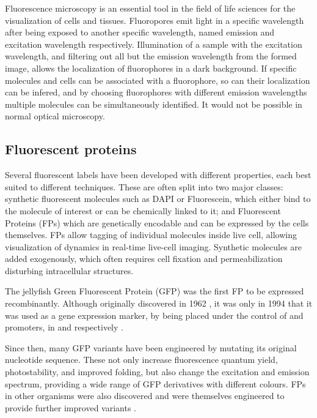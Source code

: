   Fluorescence microscopy is an essential tool in the field of life
  sciences for the visualization of cells and tissues.
  Fluoropores emit light in a specific wavelength after
  being exposed to another specific wavelength, named
  emission and excitation wavelength respectively.
  Illumination of a sample with the excitation wavelength, and filtering
  out all but the emission wavelength from the formed image, allows
  the localization of fluorophores in a dark background.
  If specific molecules and cells can be associated with a fluorophore,
  so can their localization can be infered, and by choosing fluorophores
  with different emission wavelengths multiple molecules can be
  simultaneously identified.
  It would not be possible in normal optical microscopy.

  \subsection{Fluorescent proteins}
    Several fluorescent labels have been developed with different
    properties, each best suited to different techniques.
    These are often split into two major classes: synthetic fluorescent
    molecules such as DAPI or Fluorescein, which either bind to the molecule of
    interest or can be chemically linked to it; and Fluorescent Proteins (FPs)
    which are genetically encodable and can be expressed by the cells themselves.
    FPs allow tagging of individual molecules inside live cell, allowing
    visualization of dynamics in real-time live-cell imaging.
    Synthetic molecules are added exogenously, which often requires cell
    fixation and permeabilization disturbing intracellular structures.

    The  jellyfish Green Fluorescent Protein (GFP) was
    the first FP to be expressed recombinantly.
    Although originally discovered in 1962 \citep{shimomura1962-gfp-discovery},
    it was only in 1994 that it was used as a gene expression
    marker, by being placed under the control of  and
     promoters, in  and 
    respectively \citep{gfp-first-expression-marker}.

    Since then, many GFP variants have been engineered by mutating its
    original nucleotide sequence.  These not only increase fluorescence
    quantum yield, photostability, and improved folding, but also change
    the excitation and emission spectrum, providing a wide range of GFP
    derivatives with different colours.  FPs in other organisms were also
    discovered and were themselves engineered to provide further improved
    variants \citep{FP-color-palette}.


